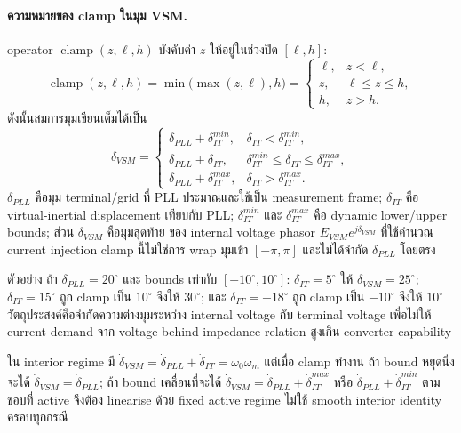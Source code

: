 \documentclass[12pt,a4paper]{article}
\newcommand{\clamp}{\operatorname{clamp}}
\begin{document}
\paragraph{ความหมายของ clamp ในมุม VSM.}
operator $\clamp(z,\ell,h)$ บังคับค่า $z$ ให้อยู่ในช่วงปิด $[\ell,h]$:
\begin{equation}
\clamp(z,\ell,h)=\min\!\bigl(\max(z,\ell),h\bigr)
=\begin{cases}
\ell,&z<\ell,\\
z,&\ell\le z\le h,\\
h,&z>h.
\end{cases}
\label{eq:clamp-definition}
\end{equation}
ดังนั้นสมการมุมเขียนเต็มได้เป็น
\begin{equation}
\delta_{VSM}=\begin{cases}
\delta_{PLL}+\delta_{IT}^{min},&\delta_{IT}<\delta_{IT}^{min},\\
\delta_{PLL}+\delta_{IT},&\delta_{IT}^{min}\le\delta_{IT}\le\delta_{IT}^{max},\\
\delta_{PLL}+\delta_{IT}^{max},&\delta_{IT}>\delta_{IT}^{max}.
\end{cases}
\label{eq:vsm-angle-piecewise}
\end{equation}
$\delta_{PLL}$ คือมุม terminal/grid ที่ PLL ประมาณและใช้เป็น measurement frame;
$\delta_{IT}$ คือ virtual-inertial displacement เทียบกับ PLL; $\delta_{IT}^{min}$ และ
$\delta_{IT}^{max}$ คือ dynamic lower/upper bounds; ส่วน $\delta_{VSM}$ คือมุมสุดท้าย
ของ internal voltage phasor $E_{VSM}e^{j\delta_{VSM}}$ ที่ใช้คำนวณ current injection
clamp นี้ไม่ใช่การ wrap มุมเข้า $[-\pi,\pi]$ และไม่ได้จำกัด $\delta_{PLL}$ โดยตรง

ตัวอย่าง ถ้า $\delta_{PLL}=20^\circ$ และ bounds เท่ากับ $[-10^\circ,10^\circ]$:
$\delta_{IT}=5^\circ$ ให้ $\delta_{VSM}=25^\circ$;
$\delta_{IT}=15^\circ$ ถูก clamp เป็น $10^\circ$ จึงให้ $30^\circ$;
และ $\delta_{IT}=-18^\circ$ ถูก clamp เป็น $-10^\circ$ จึงให้ $10^\circ$
วัตถุประสงค์คือจำกัดความต่างมุมระหว่าง internal voltage กับ terminal voltage
เพื่อไม่ให้ current demand จาก voltage-behind-impedance relation สูงเกิน converter capability

ใน interior regime มี
$\dot\delta_{VSM}=\dot\delta_{PLL}+\dot\delta_{IT}=\omega_0\omega_m$
แต่เมื่อ clamp ทำงาน ถ้า bound หยุดนิ่งจะได้
$\dot\delta_{VSM}=\dot\delta_{PLL}$; ถ้า bound เคลื่อนที่จะได้
$\dot\delta_{VSM}=\dot\delta_{PLL}+\dot\delta_{IT}^{max}$ หรือ
$\dot\delta_{PLL}+\dot\delta_{IT}^{min}$ ตามขอบที่ active
จึงต้อง linearise ด้วย fixed active regime ไม่ใช้ smooth interior identity ครอบทุกกรณี
\end{document}
